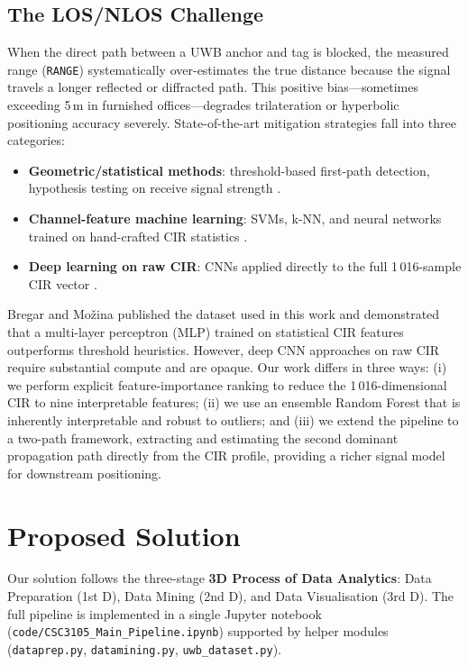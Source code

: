\documentclass[conference]{IEEEtran}
\begin{document}
\subsection{The LOS/NLOS Challenge}
When the direct path between a UWB anchor and tag is blocked, the measured range
(\texttt{RANGE}) systematically over-estimates the true distance because the signal
travels a longer reflected or diffracted path. This positive bias---sometimes exceeding
5\,m in furnished offices---degrades trilateration or hyperbolic positioning accuracy
severely. State-of-the-art mitigation strategies fall into three categories:
\begin{itemize}
    \item \textbf{Geometric/statistical methods}: threshold-based first-path detection,
          hypothesis testing on receive signal strength \cite{guvenc2009survey}.
    \item \textbf{Channel-feature machine learning}: SVMs, k-NN, and neural networks
          trained on hand-crafted CIR statistics \cite{maranò2010nlos}.
    \item \textbf{Deep learning on raw CIR}: CNNs applied directly to the full
          1\,016-sample CIR vector \cite{bregar2018improving}.
\end{itemize}

Bregar and Mo\v{z}ina \cite{bregar2018improving} published the dataset used in this work
and demonstrated that a multi-layer perceptron (MLP) trained on statistical CIR features
outperforms threshold heuristics. However, deep CNN approaches on raw CIR require
substantial compute and are opaque. Our work differs in three ways: (i) we perform
explicit feature-importance ranking to reduce the 1\,016-dimensional CIR to nine
interpretable features; (ii) we use an ensemble Random Forest that is inherently
interpretable and robust to outliers; and (iii) we extend the pipeline to a two-path
framework, extracting and estimating the second dominant propagation path directly
from the CIR profile, providing a richer signal model for downstream positioning.

\section{Proposed Solution}

Our solution follows the three-stage \textbf{3D Process of Data Analytics}: Data
Preparation (1st D), Data Mining (2nd D), and Data Visualisation (3rd D). The full
pipeline is implemented in a single Jupyter notebook
(\texttt{code/CSC3105\_Main\_Pipeline.ipynb}) supported by helper modules
(\texttt{dataprep.py}, \texttt{datamining.py}, \texttt{uwb\_dataset.py}).
\end{document}
